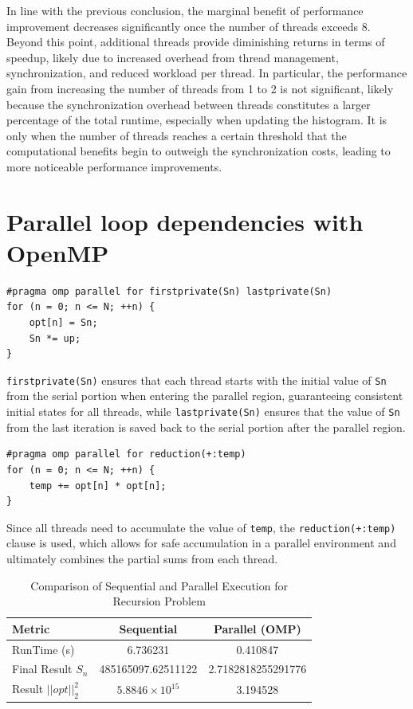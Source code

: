 \documentclass[unicode,11pt,a4paper,oneside,numbers=endperiod,openany]{scrartcl}
\begin{document}
In line with the previous conclusion, the marginal benefit of performance improvement decreases significantly once the number of threads exceeds 8. Beyond this point, additional threads provide diminishing returns in terms of speedup, likely due to increased overhead from thread management, synchronization, and reduced workload per thread. In particular, the performance gain from increasing the number of threads from 1 to 2 is not significant, likely because the synchronization overhead between threads constitutes a larger percentage of the total runtime, especially when updating the histogram. It is only when the number of threads reaches a certain threshold that the computational benefits begin to outweigh the synchronization costs, leading to more noticeable performance improvements.


\section{Parallel loop dependencies with OpenMP }
\begin{lstlisting}[language=MyC++, style=mystyle, caption={loop parallelization}]
#pragma omp parallel for firstprivate(Sn) lastprivate(Sn)
for (n = 0; n <= N; ++n) {
    opt[n] = Sn;
    Sn *= up;
}
\end{lstlisting}
\texttt{firstprivate(Sn)} ensures that each thread starts with the initial value of \texttt{Sn} from the serial portion when entering the parallel region, guaranteeing consistent initial states for all threads, while \texttt{lastprivate(Sn)} ensures that the value of \texttt{Sn} from the last iteration is saved back to the serial portion after the parallel region.
\begin{lstlisting}[language=MyC++, style=mystyle, caption={reduction}]
#pragma omp parallel for reduction(+:temp)
for (n = 0; n <= N; ++n) {
    temp += opt[n] * opt[n];
}
\end{lstlisting}
Since all threads need to accumulate the value of \texttt{temp}, the \texttt{reduction(+:temp)} clause is used, which allows for safe accumulation in a parallel environment and ultimately combines the partial sums from each thread.

\begin{table}[h]
    \centering
    \caption{Comparison of Sequential and Parallel Execution for Recursion Problem}
    \begin{tabular}{lcc}
        \toprule
        \textbf{Metric} & \textbf{Sequential} & \textbf{Parallel (OMP)} \\ \midrule
        RunTime (s) & 6.736231 & 0.410847 \\
        Final Result $S_n$ & 485165097.62511122 & 2.7182818255291776 \\
        Result $||opt||^2_2$ & $5.8846 \times 10^{15}$ & 3.194528 \\ \bottomrule
    \end{tabular}
    \label{tab:recur_comparison}
\end{table}

    

\printbibliography
\end{document}

